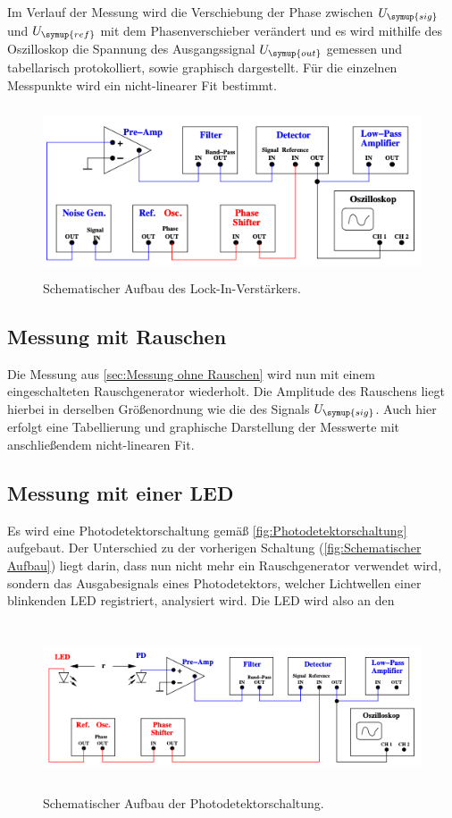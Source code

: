 Im Verlauf der Messung wird die Verschiebung der Phase zwischen $U_{\symup{sig}}$ und $U_{\symup{ref}}$ mit dem Phasenverschieber
verändert und es wird mithilfe des Oszilloskop die Spannung des Ausgangssignal $U_{\symup{out}}$ gemessen und tabellarisch
protokolliert, sowie graphisch dargestellt. Für die einzelnen Messpunkte wird ein nicht-linearer Fit bestimmt.

\begin{figure} [H]
    \centering
    \includegraphics[height=5cm]{content/Bilder/Aufbau_Schema.png}
    \caption{Schematischer Aufbau des Lock-In-Verstärkers.\cite{v303}}
    \label{fig:Schematischer Aufbau}
\end{figure}

\subsection{Messung mit Rauschen}
\label{sec:Messung mit Rauschen}
Die Messung aus \ref{sec:Messung ohne Rauschen} wird nun mit einem eingeschalteten Rauschgenerator wiederholt. Die Amplitude
des Rauschens liegt hierbei in derselben Größenordnung wie die des Signals $U_{\symup{sig}}$.
Auch hier erfolgt eine Tabellierung und graphische Darstellung der Messwerte mit anschließendem nicht-linearen Fit.

\subsection{Messung mit einer LED}
\label{sec:Messung mit einer LED}
Es wird eine Photodetektorschaltung gemäß \autoref{fig:Photodetektorschaltung} aufgebaut. Der Unterschied zu der vorherigen 
Schaltung (\autoref{fig:Schematischer Aufbau}) liegt darin, dass nun nicht mehr ein Rauschgenerator verwendet wird, sondern 
das Ausgabesignals eines Photodetektors, welcher Lichtwellen einer blinkenden LED registriert, analysiert wird. Die LED wird also
an den 

\begin{figure} [H]
    \centering
    \includegraphics[height=5cm]{content/Bilder/Aufbau_led.png}
    \caption{Schematischer Aufbau der Photodetektorschaltung.\cite{v303}}
    \label{fig:Photodetektorschaltung}
\end{figure}

